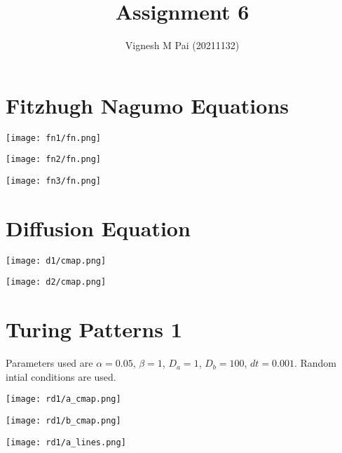 \documentclass{article}
\title{Assignment 6}
\author{Vignesh M Pai (20211132)}
\date{}
\begin{document}
\maketitle

\section*{Fitzhugh Nagumo Equations}

\begin{center}
    \texttt{[image: fn1/fn.png]}
\end{center}

\begin{center}
    \texttt{[image: fn2/fn.png]}
\end{center}

\begin{center}
    \texttt{[image: fn3/fn.png]}
\end{center}

\section*{Diffusion Equation}

\begin{center}
    \texttt{[image: d1/cmap.png]}
\end{center}

\begin{center}
    \texttt{[image: d2/cmap.png]}
\end{center}

\section*{Turing Patterns 1}

Parameters used are $\alpha = 0.05$, $\beta = 1$, $D_a = 1$, $D_b = 100$, $dt = 0.001$.
Random intial conditions are used.

\begin{center}
    \texttt{[image: rd1/a\_cmap.png]}
\end{center}

\begin{center}
    \texttt{[image: rd1/b\_cmap.png]}
\end{center}

\begin{center}
    \texttt{[image: rd1/a\_lines.png]}
\end{center}
\end{document}
